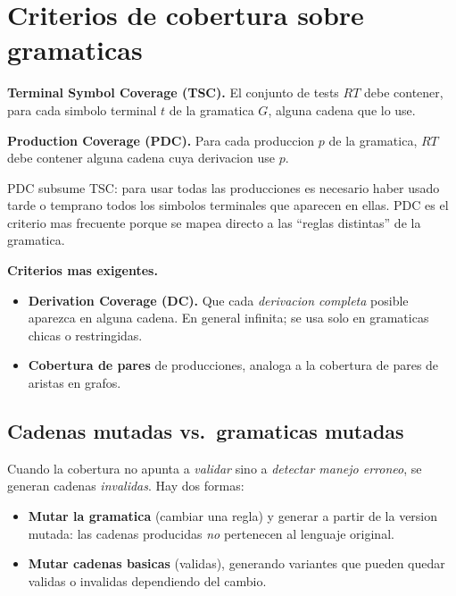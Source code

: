 \documentclass[12pt,a4paper]{article}
\begin{document}
\section{Criterios de cobertura sobre gramaticas}

\begin{definicionbox}
\textbf{Terminal Symbol Coverage (TSC).} El conjunto de tests $RT$ debe contener, para cada
simbolo terminal $t$ de la gramatica $G$, alguna cadena que lo use.
\end{definicionbox}

\begin{definicionbox}
\textbf{Production Coverage (PDC).} Para cada produccion $p$ de la gramatica, $RT$ debe
contener alguna cadena cuya derivacion use $p$.
\end{definicionbox}

\begin{ideabox}
PDC subsume TSC: para usar todas las producciones es necesario haber usado tarde o temprano
todos los simbolos terminales que aparecen en ellas. PDC es el criterio mas frecuente porque
se mapea directo a las ``reglas distintas'' de la gramatica.
\end{ideabox}

\textbf{Criterios mas exigentes.}

\begin{itemize}
  \item \textbf{Derivation Coverage (DC).} Que cada \emph{derivacion completa} posible aparezca
  en alguna cadena. En general infinita; se usa solo en gramaticas chicas o restringidas.
  \item \textbf{Cobertura de pares} de producciones, analoga a la cobertura de pares de aristas
  en grafos.
\end{itemize}

\subsection{Cadenas mutadas vs.\ gramaticas mutadas}

Cuando la cobertura no apunta a \emph{validar} sino a \emph{detectar manejo erroneo}, se
generan cadenas \emph{invalidas}. Hay dos formas:

\begin{itemize}
  \item \textbf{Mutar la gramatica} (cambiar una regla) y generar a partir de la version
  mutada: las cadenas producidas \emph{no} pertenecen al lenguaje original.
  \item \textbf{Mutar cadenas basicas} (validas), generando variantes que pueden quedar
  validas o invalidas dependiendo del cambio.
\end{itemize}
\end{document}
